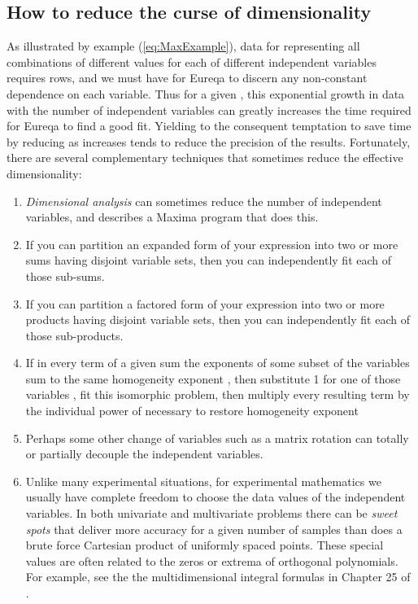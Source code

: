 \documentclass[12pt,english]{article}
\begin{document}
\subsection{How to reduce the curse of dimensionality}

As illustrated by example (\ref{eq:MaxExample}), data for representing
all combinations of  different values for each of  different
independent variables requires  rows, and we must have 
for Eureqa to discern any non-constant dependence on each variable.
Thus for a given , this exponential growth in data with the number
of independent variables can greatly increases the time required for
Eureqa to find a good fit. Yielding to the consequent temptation to
save time by reducing  as  increases tends to reduce the precision
of the results. Fortunately, there are several complementary techniques
that sometimes reduce the effective dimensionality:\vspace{-5pt}

\begin{enumerate}
\item \textsl{Dimensional analysis} can sometimes reduce the number of independent
variables, and \cite{StoutemyerDimensionalAnalysis} describes a Maxima
program that does this.\vspace{-5pt}

\item If you can partition an expanded form of your expression into two
or more sums having disjoint variable sets, then you can independently
fit each of those sub-sums.\vspace{-5pt}

\item If you can partition a factored form of your expression into two or
more products having disjoint variable sets, then you can independently
fit each of those sub-products.\vspace{-5pt}

\item If in every term of a given sum the exponents of some subset of the
variables sum to the same homogeneity exponent , then substitute
1 for one of those variables , fit this isomorphic problem, then
multiply every resulting term by the individual power of  necessary
to restore homogeneity exponent \vspace{-5pt}

\item Perhaps some other change of variables such as a matrix rotation can
totally or partially decouple the independent variables.
\item Unlike many experimental situations, for experimental mathematics
we usually have complete freedom to choose the data values of the
independent variables. In both univariate and multivariate problems
there can be \textsl{sweet spots} that deliver more accuracy for a
given number of samples than does a brute force Cartesian product
of uniformly spaced points. These special values are often related
to the zeros or extrema of orthogonal polynomials. For example, see
the the multidimensional integral formulas in Chapter 25 of \cite{AbramowitzAndSegun}.
\end{enumerate}
\end{document}
